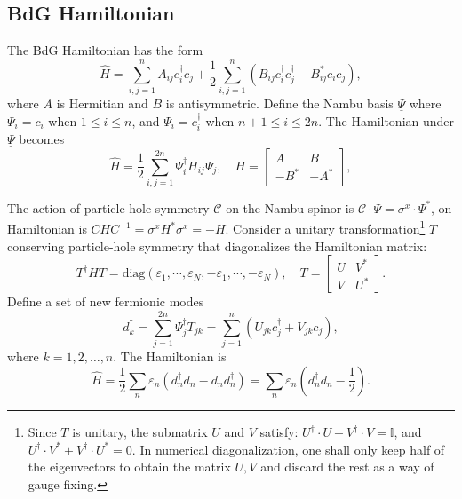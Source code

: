 \documentclass{SciPost}
\begin{document}
\subsection{BdG Hamiltonian}
The BdG Hamiltonian has the form
\begin{equation}
	\hat H = \sum_{i,j=1}^n A_{ij} c_i^\dagger c_j+\frac{1}{2}\sum_{i,j=1}^n (B_{ij}c_i^\dagger c_j^\dagger-B_{ij}^*c_ic_j),
\end{equation}
where $A$ is Hermitian and $B$ is antisymmetric. 
Define the Nambu basis $\underline\Psi$ where $\Psi_i = c_i$ when $1 \le i \le n$, and $\Psi_i = c_i^\dagger$ when $n+1 \le i \le 2n$.
The Hamiltonian under $\underline\Psi$ becomes
\begin{equation}
	\hat H = \frac{1}{2}\sum_{i,j=1}^{2n} \Psi_i^\dagger H_{ij} \Psi_j, \quad
	H= \begin{bmatrix} A & B \\ -B^* & -A^* \end{bmatrix},
\end{equation}

The action of particle-hole symmetry $\mathcal C$ on the Nambu spinor is $\mathcal C \cdot \Psi = \sigma^x \cdot\Psi^*$, on Hamiltonian is $C H C^{-1} = \sigma^x H^* \sigma^x = -H$. 
Consider a unitary transformation\footnote{Since $T$ is unitary, the submatrix $U$ and $V$ satisfy: $U^\dagger \cdot U + V^\dagger \cdot V = \mathbb I$, and $U^\dagger \cdot V^* + V^\dagger \cdot U^* = 0$. In numerical diagonalization, one shall only keep half of the eigenvectors to obtain the matrix $U, V$ and discard the rest as a way of gauge fixing.} $T$ conserving particle-hole symmetry that diagonalizes the Hamiltonian matrix:
\begin{equation}
	T^\dagger H T = \mathrm{diag}(\varepsilon_1,\cdots,\varepsilon_N,-\varepsilon_1,\cdots,-\varepsilon_N),\quad
	T = \begin{bmatrix}
		U & V^* \\ V & U^*
	\end{bmatrix}.
\end{equation}
Define a set of new fermionic modes
\begin{equation}
	d_k^\dagger = \sum_{j=1}^{2n} \Psi_j^\dagger T_{jk}
	= \sum_{j=1}^n (U_{jk} c_j^\dagger + V_{jk} c_j),
\end{equation}
where $k = 1,2,\dots,n$.
The Hamiltonian is
\begin{equation}
	\hat H = \frac{1}{2} \sum_n \varepsilon_n (d_n^\dagger d_n- d_n d_n^\dagger) 
	= \sum_n \varepsilon_n\left(d_n^\dagger d_n-\frac{1}{2}\right).
\end{equation}
\end{document}
